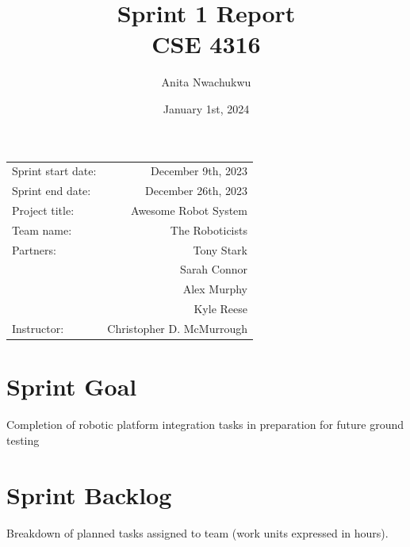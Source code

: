 \documentclass{article}
\title{Sprint 1 Report \\ CSE 4316}
\author{Anita Nwachukwu}
\date{January 1st, 2024}
\begin{document}
\maketitle
\begin{center}
\begin{tabular}{l r}

Sprint start date: & December 9th, 2023 \\

Sprint end date: & December 26th, 2023 \\

Project title: & Awesome Robot System \\

Team name: & The Roboticists \\

Partners: 	& Tony Stark \\
			& Sarah Connor \\
			& Alex Murphy \\
        	& Kyle Reese \\
Instructor: & Christopher D. McMurrough
\end{tabular}
\end{center}

\section{Sprint Goal}
Completion of robotic platform integration tasks in preparation for future ground testing

\section{Sprint Backlog}
Breakdown of planned tasks assigned to team (work units expressed in hours). \\ %
\end{document}
